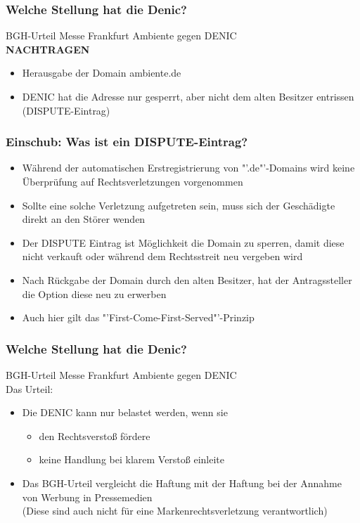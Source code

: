 \documentclass{beamer}
\begin{document}
	\begin{frame}
		\frametitle{Welche Stellung hat die Denic?}
		BGH-Urteil \glqq Messe Frankfurt Ambiente gegen DENIC\grqq\\
		\textbf{NACHTRAGEN}
		\begin{itemize}
			\item Herausgabe der Domain ambiente.de
			\item DENIC hat die Adresse nur gesperrt, aber nicht dem alten Besitzer entrissen (DISPUTE-Eintrag)
		\end{itemize}
	\end{frame}
	
	
	\begin{frame}
		\frametitle{Einschub: Was ist ein DISPUTE-Eintrag?}
		\begin{itemize}
			\item Während der automatischen Erstregistrierung von "'.de"'-Domains wird keine Überprüfung auf Rechtsverletzungen vorgenommen
			\item Sollte eine solche Verletzung aufgetreten sein, muss sich der Geschädigte direkt an den Störer wenden
			\item Der DISPUTE Eintrag ist Möglichkeit die Domain zu sperren, damit diese nicht verkauft oder während dem Rechtsstreit neu vergeben wird
			\item Nach Rückgabe der Domain durch den alten Besitzer, hat der Antragssteller die Option diese neu zu erwerben
			\item Auch hier gilt das "'First-Come-First-Served"'-Prinzip
		\end{itemize}	
	\end{frame}	
	
	\begin{frame}
		\frametitle{Welche Stellung hat die Denic?}
		BGH-Urteil \glqq Messe Frankfurt Ambiente gegen DENIC\grqq\\
		Das Urteil:
		\begin{itemize}
			\item Die DENIC kann nur belastet werden, wenn sie
			\begin{itemize}
				\item den Rechtsverstoß fördere
				\item keine Handlung bei klarem Verstoß einleite
			\end{itemize}
			\item Das BGH-Urteil vergleicht die Haftung mit der Haftung bei der Annahme von Werbung in Pressemedien\\(Diese sind auch nicht für eine Markenrechtsverletzung verantwortlich)
		\end{itemize}
	\end{frame}
	
\end{document}
